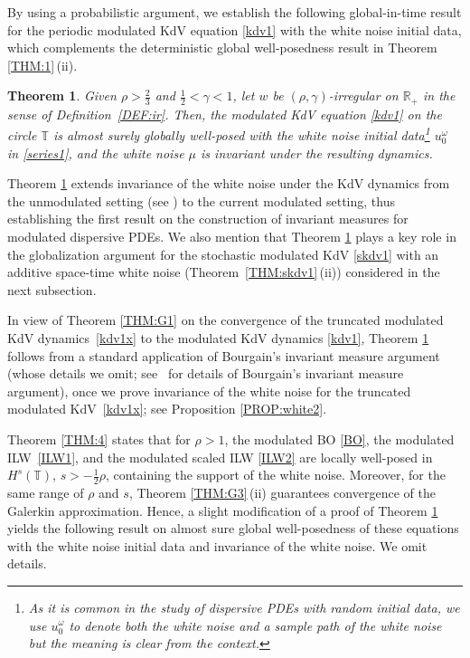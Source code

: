 \documentclass[letterpaper, 11pt,  reqno]{amsart}
\newtheorem{theorem}{Theorem} [section]
\newcommand{\1}{\hspace{0.5mm}\text{I}\hspace{0.5mm}}
\newcommand{\R}{\mathbb{R}}
\newcommand{\T}{\mathbb{T}}
\newcommand{\g}{\gamma}
\renewcommand{\o}{\omega}
\numberwithin{equation}{section}
\numberwithin{theorem}{section}
\begin{document}
By using a probabilistic argument, 
we establish the following global-in-time result
for 
the periodic modulated KdV equation \eqref{kdv1}
with the white noise initial data, 
which complements the deterministic
global well-posedness result in Theorem \ref{THM:1}\,(ii).




\begin{theorem}\label{THM:white1}
Given $\rho > \frac 23 $ and  $\frac12< \g < 1$, 
let  $w$ be $(\rho,\g)$-irregular on $\R_+$ in the sense of Definition~\ref{DEF:ir}.
Then, the modulated KdV equation \eqref{kdv1}
on the circle $\T$
is almost surely globally well-posed
with the white noise initial data\footnote{As it is common
in the study of dispersive PDEs with random initial data, 
we use $u_0^\o$ to denote both the white noise
and a sample path of the white noise but the meaning is clear from the context.}
$u_0^\o$ in \eqref{series1}, 
and the white noise $\mu$ is invariant under the resulting dynamics.


\end{theorem}



Theorem \ref{THM:white1}
extends 
invariance of the white noise under the KdV dynamics
from the unmodulated setting (see \cite{QV, Oh1, Oh2, Oh10, OQV, KMV})
to the current modulated setting, 
thus establishing the first result 
on the construction of invariant measures
for modulated dispersive PDEs.
We also mention 
that 
Theorem \ref{THM:white1}
plays a key role in the globalization
argument for
the stochastic modulated KdV \eqref{skdv1}
with an additive space-time white noise
 (Theorem~\ref{THM:skdv1}\,(ii))
 considered in the next subsection.

In view of 
Theorem \ref{THM:G1} on 
the convergence of the truncated modulated KdV dynamics~\eqref{kdv1x}
to the modulated KdV dynamics \eqref{kdv1}, 
Theorem \ref{THM:white1}
follows from a standard application of 
 Bourgain's invariant measure argument \cite{BO94, BO96}
(whose details we omit; see~\cite{BT1} for 
details of  Bourgain's invariant measure argument), 
once we prove invariance of the white noise
for the truncated modulated KdV~\eqref{kdv1x}; see Proposition \ref{PROP:white2}.




Theorem \ref{THM:4}
states that 
for $\rho > 1$, 
 the modulated BO \eqref{BO}, 
the modulated ILW~\eqref{ILW1}, 
and the modulated scaled ILW \eqref{ILW2}
are locally well-posed 
in $H^s(\T)$, $s > -\frac 12 \rho$, 
containing the support of the white noise.
Moreover, 
for the same range of $\rho$ and $s$, 
Theorem \ref{THM:G3}\,(ii)
guarantees convergence of the Galerkin approximation.
Hence,
a slight modification of a proof of Theorem \ref{THM:white1}
yields
 the following result
on almost sure global well-posedness
of these equations with the white noise initial data
and invariance of the white noise.
We omit details.
\end{document}
